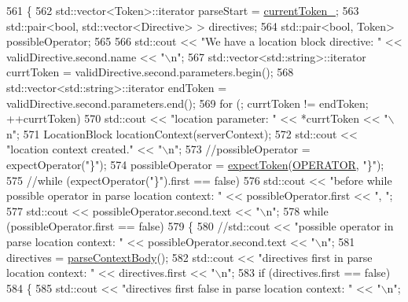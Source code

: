 \begin{DoxyCode}
561     \{
562         std::vector<Token>::iterator parseStart = \hyperlink{classft_1_1_parser_a942c5b794d108f144c5b5028aaa34cb6}{currentToken\_};
563         std::pair<bool, std::vector<Directive> > directives;
564         std::pair<bool, Token> possibleOperator;
565 
566         std::cout << \textcolor{stringliteral}{"We have a location block directive: "} << validDirective.second.name << \textcolor{stringliteral}{"\(\backslash\)n"};
567         std::vector<std::string>::iterator  currtToken = validDirective.second.parameters.begin();
568         std::vector<std::string>::iterator  endToken = validDirective.second.parameters.end();
569         \textcolor{keywordflow}{for} (; currtToken != endToken; ++currtToken)
570             std::cout << \textcolor{stringliteral}{"location parameter: "} << *currtToken << \textcolor{stringliteral}{"\(\backslash\)n"};
571         LocationBlock   locationContext(serverContext);
572         std::cout << \textcolor{stringliteral}{"location context created."} << \textcolor{stringliteral}{"\(\backslash\)n"};
573         \textcolor{comment}{//possibleOperator = expectOperator("\}");}
574         possibleOperator = \hyperlink{classft_1_1_parser_a1615a752d3642bb53598e2c8db810db0}{expectToken}(\hyperlink{namespaceft_aa520fbf142ba1e7e659590c07da31921a6411d9d6073252e4d316493506bbb979}{OPERATOR}, \textcolor{stringliteral}{"\}"});
575         \textcolor{comment}{//while (expectOperator("\}").first == false)}
576         std::cout << \textcolor{stringliteral}{"before while possible operator in parse location context: "} << possibleOperator.first
       << \textcolor{stringliteral}{", "};
577         std::cout << possibleOperator.second.text << \textcolor{stringliteral}{"\(\backslash\)n"};
578         \textcolor{keywordflow}{while} (possibleOperator.first == \textcolor{keyword}{false})
579         \{
580             \textcolor{comment}{//std::cout << "possible operator in parse location context: " << possibleOperator.second.text
       << "\(\backslash\)n";}
581             directives = \hyperlink{classft_1_1_parser_aa8d68b83134b46e4b9115d9acd0cbf57}{parseContextBody}();
582             std::cout << \textcolor{stringliteral}{"directives first in parse location context: "} << directives.first << \textcolor{stringliteral}{"\(\backslash\)n"};
583             \textcolor{keywordflow}{if} (directives.first == \textcolor{keyword}{false})
584             \{
585                 std::cout << \textcolor{stringliteral}{"directives first false in parse location context: "} << \textcolor{stringliteral}{"\(\backslash\)n"};

\end{DoxyCode}
